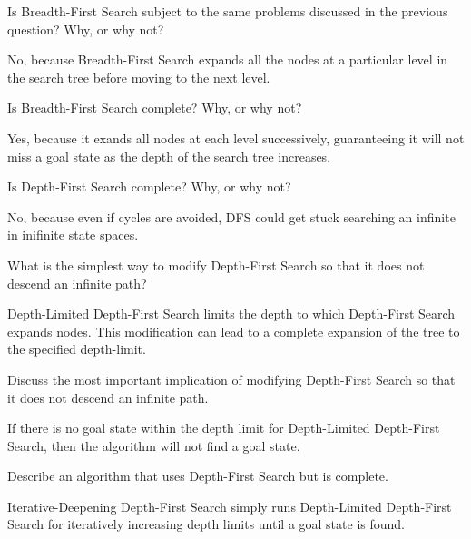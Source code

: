 \begin{questions}
\begin{solution}[4.75in]
\end{solution}

\question Is Breadth-First Search subject to the same problems discussed in the previous question?  Why, or why not?

\begin{solution}[.5in]
No, because Breadth-First Search expands all the nodes at a particular level in the search tree before moving to the next level.
\end{solution}

\newpage

\question Is Breadth-First Search complete?  Why, or why not?

\begin{solution}[1in]
Yes, because it exands all nodes at each level successively, guaranteeing it will not miss a goal state as the depth of the search tree increases.
\end{solution}

\question Is Depth-First Search complete?  Why, or why not?

\begin{solution}[1in]
No, because even if cycles are avoided, DFS could get stuck searching an infinite in inifinite state spaces.
\end{solution}

\question What is the simplest way to modify Depth-First Search so that it does not descend an infinite path?

\begin{solution}[1.25in]
Depth-Limited Depth-First Search limits the depth to which Depth-First Search expands nodes.  This modification can lead to a complete expansion of the tree to the specified depth-limit.
\end{solution}

\question Discuss the most important implication of modifying Depth-First Search so that it does not descend an infinite path.

\begin{solution}[1.25in]
If there is no goal state within the depth limit for Depth-Limited Depth-First Search, then the algorithm will not find a goal state.
\end{solution}

\question Describe an algorithm that uses Depth-First Search but is complete.

\begin{solution}[1.75in]
Iterative-Deepening Depth-First Search simply runs Depth-Limited Depth-First Search for iteratively increasing depth limits until a goal state is found.
\end{solution}


\end{questions}
